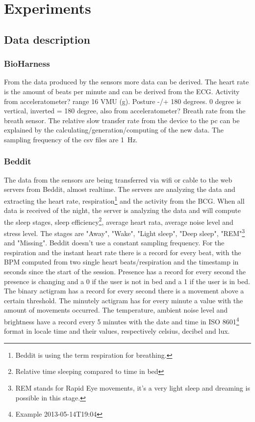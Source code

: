\section{Experiments}
	\subsection{Data description}
		\subsubsection{BioHarness}
			From the data produced by the sensors more data can be derived. The heart rate is the amount of beats per minute and can be derived from the ECG.  
			Activity from acceleratometer? range 16 VMU (g).
			Posture -/+ 180 degrees. 0 degree is vertical, inverted = 180 degree, also from acceleratometer?
			Breath rate from the breath sensor. 
			The relative slow transfer rate from the device to the pc can be explained by the calculating/generation/computing of the new data.
			The sampling frequency of the csv files are \SI{1}{\hertz}.
		\subsubsection{Beddit}
		\label{sec:datadescriptionbeddit}
		The data from the sensors are being transferred via wifi or cable to the web servers from Beddit, almost realtime. The servers are analyzing the data and extracting the heart rate, respiration\footnote{Beddit is using the term respiration for breathing.} and the activity from the BCG. When all data is received of the night, the server is analyzing the data and will compute the sleep stages, sleep efficiency\footnote{Relative time sleeping compared to time in bed}, average heart rata, average noise level and stress level. The stages are "Away", "Wake", "Light sleep", "Deep sleep", "REM"\footnote{REM stands for Rapid Eye movements, it's a very light sleep and dreaming is possible in this stage.} and "Missing". Beddit doesn't use a constant sampling frequency. For the respiration and the instant heart rate there is a record for every beat, with the BPM computed from two single heart beats/respiration and the timestamp in seconds since the start of the session. Presence has a record for every second the presence is changing and a 0 if the user is not in bed and a 1 if the user is in bed. The binary actigram has a record for every second there is a movement above a certain threshold. The minutely actigram has for every minute a value with the amount of movements occurred. The temperature, ambient noise level and brightness have a record every 5 minutes with the date and time in ISO 8601\footnote{Example 2013-05-14T19:04\cite{iso8601}} format in locale time and their values, respectively celsius, decibel and lux.

